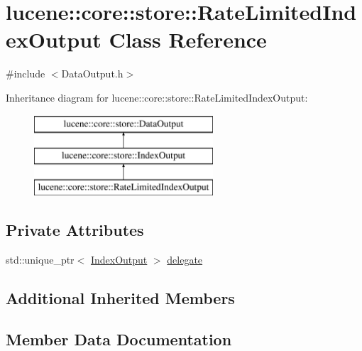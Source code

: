 \hypertarget{classlucene_1_1core_1_1store_1_1RateLimitedIndexOutput}{}\section{lucene\+:\+:core\+:\+:store\+:\+:Rate\+Limited\+Index\+Output Class Reference}
\label{classlucene_1_1core_1_1store_1_1RateLimitedIndexOutput}


{\ttfamily \#include $<$Data\+Output.\+h$>$}

Inheritance diagram for lucene\+:\+:core\+:\+:store\+:\+:Rate\+Limited\+Index\+Output\+:\begin{figure}[H]
\begin{center}
\leavevmode
\includegraphics[height=3.000000cm]{classlucene_1_1core_1_1store_1_1RateLimitedIndexOutput}
\end{center}
\end{figure}
\subsection*{Private Attributes}
\begin{DoxyCompactItemize}
\item 
std\+::unique\+\_\+ptr$<$ \mbox{\hyperlink{classlucene_1_1core_1_1store_1_1IndexOutput}{Index\+Output}} $>$ \mbox{\hyperlink{classlucene_1_1core_1_1store_1_1RateLimitedIndexOutput_a259d5a942b7ab06f13ce7a0f2e884d63}{delegate}}
\end{DoxyCompactItemize}
\subsection*{Additional Inherited Members}


\subsection{Member Data Documentation}
\mbox{\label{classlucene_1_1core_1_1store_1_1RateLimitedIndexOutput_a259d5a942b7ab06f13ce7a0f2e884d63}} 
